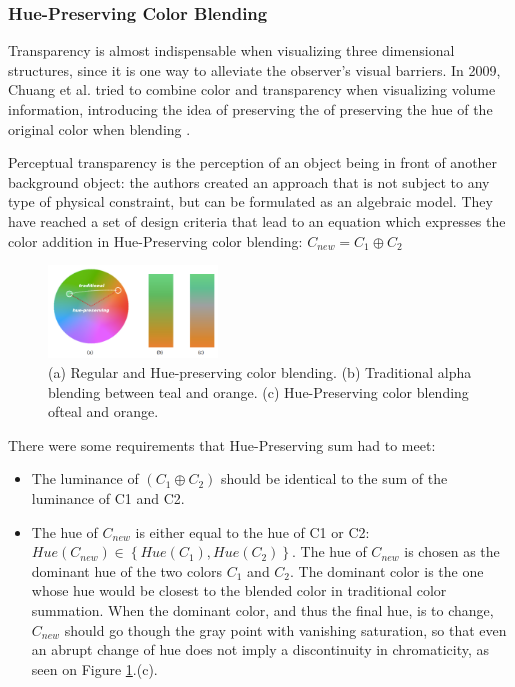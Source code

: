 \subsubsection{Hue-Preserving Color Blending}
%
Transparency is almost indispensable when visualizing three dimensional structures, since it is one way to
alleviate the observer’s visual barriers.
In 2009, Chuang et al. tried to combine color and transparency when visualizing volume information,
introducing the idea of preserving the of preserving the hue of the original color when blending \cite{Chuang2009}. \par
Perceptual transparency is the perception of an object being in front of another
background object: the authors created an approach that is not subject to any type of physical constraint, but can be
formulated as an algebraic model. They have reached a set of design criteria that lead
to an equation which expresses the color addition in Hue-Preserving color blending: $C_{new} = C_{1} \oplus C_{2}$ \par
%
\begin{figure}
	\centering
    \vspace{-10pt}
    \includegraphics[width=0.4\textwidth]{images/background/HuePreserving.png}
    \caption[Hue-Preserving Color Blending - Orange-Green Scale]{(a) Regular and
    Hue-preserving color blending. (b) Traditional alpha blending between teal and orange. (c) Hue-Preserving
    color blending ofteal and orange.
    \protect\cite{Chuang2009}}
    \label{fig:huepreserving1}
\end{figure}
%
There were some requirements that Hue-Preserving sum had to meet:
    \begin{itemize}
			\setlength\itemsep{0.01em}
    \item The luminance of $\left(C_{1} \oplus C_{2}\right)$ should be identical to the sum of the
    luminance of C1 and C2.
    \item The hue of $C_{new}$ is either equal to the hue of C1 or C2: $Hue(C_{new}) \in \left\{Hue(C_{1}),
    Hue(C_{2})\right\}$. The hue of $C_{new}$ is chosen as the dominant hue of the two colors $C_{1}$ and $C_{2}$. The
    dominant color is the one whose hue would be closest to the blended color in traditional color summation.
    When the dominant color, and thus the final hue, is to change, $C_{new}$ should go though the gray point
    with vanishing saturation, so that even an abrupt change of hue does not imply a discontinuity in
    chromaticity, as seen on Figure \ref{fig:huepreserving1}.(c).
    \end{itemize} \par
